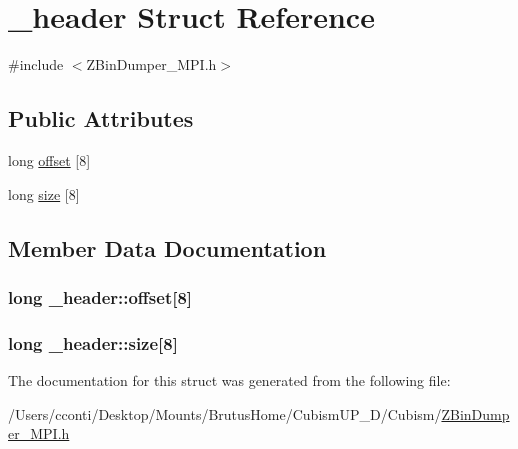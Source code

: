 \hypertarget{struct__header}{}\section{\+\_\+header Struct Reference}
\label{struct__header}


{\ttfamily \#include $<$Z\+Bin\+Dumper\+\_\+\+M\+P\+I.\+h$>$}

\subsection*{Public Attributes}
\begin{DoxyCompactItemize}
\item 
long \hyperlink{struct__header_a246169d2b9ff16a190fdf4ce59cd34c6}{offset} \mbox{[}8\mbox{]}
\item 
long \hyperlink{struct__header_a0ddee6f91054f1f35cad4311f1556491}{size} \mbox{[}8\mbox{]}
\end{DoxyCompactItemize}


\subsection{Member Data Documentation}
\hypertarget{struct__header_a246169d2b9ff16a190fdf4ce59cd34c6}{}
\subsubsection[{offset}]{\setlength{\rightskip}{0pt plus 5cm}long \+\_\+header\+::offset\mbox{[}8\mbox{]}}\label{struct__header_a246169d2b9ff16a190fdf4ce59cd34c6}
\hypertarget{struct__header_a0ddee6f91054f1f35cad4311f1556491}{}
\subsubsection[{size}]{\setlength{\rightskip}{0pt plus 5cm}long \+\_\+header\+::size\mbox{[}8\mbox{]}}\label{struct__header_a0ddee6f91054f1f35cad4311f1556491}


The documentation for this struct was generated from the following file\+:\begin{DoxyCompactItemize}
\item 
/\+Users/cconti/\+Desktop/\+Mounts/\+Brutus\+Home/\+Cubism\+U\+P\+\_\+D/\+Cubism/\hyperlink{_z_bin_dumper___m_p_i_8h}{Z\+Bin\+Dumper\+\_\+\+M\+P\+I.\+h}\end{DoxyCompactItemize}
